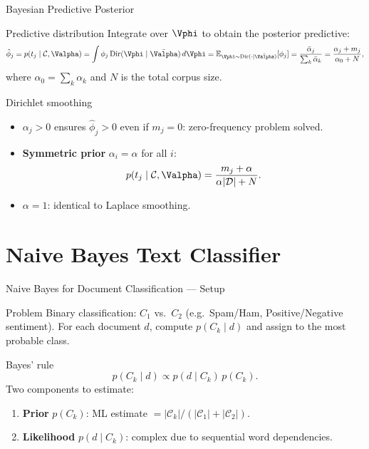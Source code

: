 \begin{frame}{Bayesian Predictive Posterior}
  \begin{block}{Predictive distribution}
    Integrate over $\Vphi$ to obtain the posterior predictive:
    \[
      \hat\phi_j=p(t_j\mid\mathcal{C},\Valpha)
      =\int\phi_j\,\mathrm{Dir}(\Vphi\mid\bar\Valpha)\,d\Vphi
      =\mathbb{E}_{\Vphi\sim\mathrm{Dir}(\cdot\mid\bar\Valpha)}[\phi_j]
      =\frac{\bar\alpha_j}{\sum_k\bar\alpha_k}
      =\frac{\alpha_j+m_j}{\alpha_0+N},
    \]
    where $\alpha_0=\sum_k\alpha_k$ and $N$ is the total corpus size.
  \end{block}

  \begin{block}{Dirichlet smoothing}
    \begin{itemize}
      \item $\alpha_j>0$ ensures $\hat\phi_j>0$ even if $m_j=0$: zero-frequency problem solved.
      \item \textbf{Symmetric prior} $\alpha_i=\alpha$ for all $i$:
        \[
          p(t_j\mid\mathcal{C},\Valpha)=\frac{m_j+\alpha}{\alpha|\mathcal{D}|+N}.
        \]
      \item \textbf{$\alpha=1$}: identical to Laplace smoothing.
    \end{itemize}
  \end{block}
\end{frame}

\section{Naive Bayes Text Classifier}

\begin{frame}{Naive Bayes for Document Classification — Setup}
  \begin{block}{Problem}
    Binary classification: $C_1$ vs.\ $C_2$ (e.g.\ Spam/Ham, Positive/Negative sentiment).
    For each document $d$, compute $p(C_k\mid d)$ and assign to the most probable class.
  \end{block}

  \begin{block}{Bayes' rule}
    \[
      p(C_k\mid d)\propto p(d\mid C_k)\,p(C_k).
    \]
    Two components to estimate:
    \begin{enumerate}
      \item \textbf{Prior} $p(C_k)$: ML estimate $=|\mathcal{C}_k|/(|\mathcal{C}_1|+|\mathcal{C}_2|)$.
      \item \textbf{Likelihood} $p(d\mid C_k)$: complex due to sequential word dependencies.
    \end{enumerate}
  \end{block}
\end{frame}

